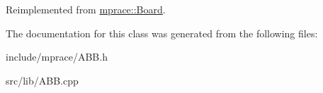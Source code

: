 Reimplemented from \hyperlink{classmprace_1_1Board_a7}{mprace::Board}.

The documentation for this class was generated from the following files:\begin{CompactItemize}
\item 
include/mprace/ABB.h\item 
src/lib/ABB.cpp\end{CompactItemize}
